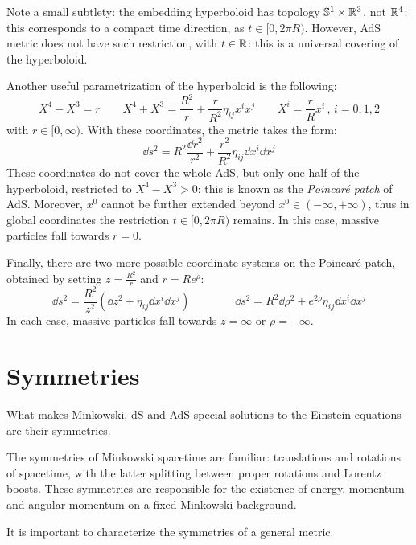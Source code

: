 Note a small subtlety: the embedding hyperboloid has topology $ \mathbb{S}^{1} \times \mathbb{R}^3 $, not $ \mathbb{R}^4 $: this corresponds to a compact time direction, as $ t \in [0, 2\pi R) $. However, AdS metric does not have such restriction, with $ t \in \mathbb{R} $: this is a universal covering of the hyperboloid.

Another useful parametrization of the hyperboloid is the following:
\begin{equation*}
  X^4 - X^3 = r
  \qquad
  X^4 + X^3 = \frac{R^2}{r} + \frac{r}{R^2} \eta_{ij} x^i x^j
  \qquad
  X^i = \frac{r}{R} x^i
  \,,\, i = 0,1,2
\end{equation*}
with $ r \in [0, \infty) $. With these coordinates, the metric takes the form:
\begin{equation*}
  \dd s^2 = R^2 \frac{\dd r^2}{r^2} + \frac{r^2}{R^2} \eta_{ij} \dd x^i \dd x^j
\end{equation*}
These coordinates do not cover the whole AdS, but only one-half of the hyperboloid, restricted to $ X^4 - X^3 > 0 $: this is known as the \textit{Poincaré patch} of AdS. Moreover, $ x^0 $ cannot be further extended beyond $ x^0 \in (-\infty, +\infty) $, thus in global coordinates the restriction $ t \in [0,2\pi R) $ remains. In this case, massive particles fall towards $ r = 0 $.

Finally, there are two more possible coordinate systems on the Poincaré patch, obtained by setting $ z = \frac{R^2}{r} $ and $ r = R e^\rho $:
\begin{equation*}
  \dd s^2 = \frac{R^2}{z^2} \left( \dd z^2 + \eta_{ij} \dd x^i \dd x^j \right)
  \qquad \qquad
  \dd s^2 = R^2 \dd \rho^2 + e^{2\rho} \eta_{ij} \dd x^i \dd x^j
\end{equation*}
In each case, massive particles fall towards $ z = \infty $ or $ \rho = -\infty $.

\newpage
\section{Symmetries}

What makes Minkowski, dS and AdS special solutions to the Einstein equations are their symmetries.

The symmetries of Minkowski spacetime are familiar: translations and rotations of spacetime, with the latter splitting between proper rotations and Lorentz boosts. These symmetries are responsible for the existence of energy, momentum and angular momentum on a fixed Minkowski background.

It is important to characterize the symmetries of a general metric.

